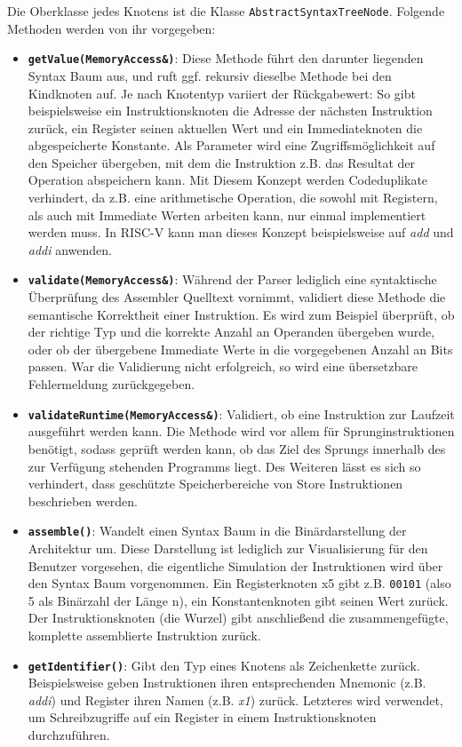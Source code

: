 Die Oberklasse jedes Knotens ist die Klasse \texttt{AbstractSyntaxTreeNode}.
Folgende Methoden werden von ihr vorgegeben:

\begin{itemize}
	\label{dev-manual-arch-node-functions}
	\item \textbf{\texttt{getValue(MemoryAccess\&)}}: Diese Methode führt den
	darunter liegenden Syntax Baum aus, und ruft ggf. rekursiv dieselbe Methode
	bei den Kindknoten auf. Je nach Knotentyp variiert der Rückgabewert: So gibt
	beispielsweise ein Instruktionsknoten die Adresse der nächsten Instruktion
	zurück, ein Register seinen aktuellen Wert und ein Immediateknoten die
	abgespeicherte Konstante. Als Parameter wird eine Zugriffsmöglichkeit auf den
	Speicher übergeben, mit dem die Instruktion z.B. das Resultat der Operation
	abspeichern kann.
	Mit Diesem Konzept werden Codeduplikate verhindert, da z.B. eine arithmetische
	Operation, die sowohl mit Registern, als auch mit Immediate Werten arbeiten
	kann, nur einmal implementiert werden muss. In RISC-V kann man dieses Konzept
	beispielsweise auf \emph{add} und \emph{addi} anwenden.

	\item \textbf{\texttt{validate(MemoryAccess\&)}}: Während der Parser lediglich
	eine syntaktische Überprüfung des Assembler Quelltext vornimmt, validiert
	diese Methode die semantische Korrektheit einer Instruktion. Es wird zum
	Beispiel überprüft, ob der richtige Typ und die korrekte Anzahl an Operanden
	übergeben wurde, oder ob der übergebene Immediate Werte in die vorgegebenen
	Anzahl an Bits passen. War die Validierung nicht erfolgreich, so wird eine
	übersetzbare Fehlermeldung zurückgegeben.

	\item \textbf{\texttt{validateRuntime(MemoryAccess\&)}}: Validiert, ob eine
	Instruktion zur Laufzeit ausgeführt werden kann. Die Methode wird vor allem
	für Sprunginstruktionen benötigt, sodass geprüft werden kann, ob das Ziel
	des Sprungs innerhalb des zur Verfügung stehenden Programms liegt. Des
	Weiteren lässt es sich so verhindert, dass geschützte Speicherbereiche
	von Store Instruktionen beschrieben werden.

	\item \textbf{\texttt{assemble()}}: Wandelt einen Syntax Baum in die
	Binärdarstellung der Architektur um. Diese Darstellung ist lediglich zur
	Visualisierung für den Benutzer vorgesehen, die eigentliche Simulation der
	Instruktionen wird über den Syntax Baum vorgenommen. Ein Registerknoten x5
	gibt z.B. \texttt{00101} (also 5 als Binärzahl der Länge n), ein Konstantenknoten gibt seinen Wert
	zurück. Der Instruktionsknoten (die Wurzel) gibt anschließend die
	zusammengefügte, komplette assemblierte Instruktion zurück.

	\item \textbf{\texttt{getIdentifier()}}: Gibt den Typ eines Knotens als
	Zeichenkette zurück. Beispielsweise geben Instruktionen ihren entsprechenden
	Mnemonic (z.B. \emph{addi}) und Register ihren Namen (z.B. \emph{x1})
	zurück. Letzteres wird verwendet, um Schreibzugriffe auf ein Register
	in einem Instruktionsknoten durchzuführen.
\end{itemize}

